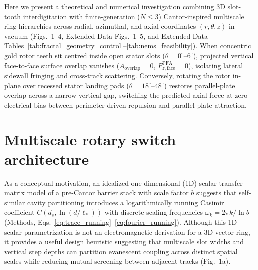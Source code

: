 \documentclass[11pt, a4paper]{article}
\begin{document}
Here we present a theoretical and numerical investigation combining 3D slot-tooth interdigitation with finite-generation ($N \le 3$) Cantor-inspired multiscale ring hierarchies across radial, azimuthal, and axial coordinates $(r, \theta, z)$ in vacuum (Figs.~1--4, Extended Data Figs.~1--5, and Extended Data Tables~\ref{tab:fractal_geometry_control}--\ref{tab:nems_feasibility}). When concentric gold rotor teeth sit centred inside open stator slots ($\theta = 0^\circ\text{--}6^\circ$), projected vertical face-to-face surface overlap vanishes ($A_{\mathrm{overlap}} = 0$, $F_{z,\mathrm{face}}^{\mathrm{PFA}} = 0$), isolating lateral sidewall fringing and cross-track scattering. Conversely, rotating the rotor in-plane over recessed stator landing pads ($\theta = 18^\circ\text{--}48^\circ$) restores parallel-plate overlap across a narrow vertical gap, switching the predicted axial force at zero electrical bias between perimeter-driven repulsion and parallel-plate attraction.

\section*{Multiscale rotary switch architecture}

As a conceptual motivation, an idealized one-dimensional (1D) scalar transfer-matrix model of a pre-Cantor barrier stack with scale factor $b$ suggests that self-similar cavity partitioning introduces a logarithmically running Casimir coefficient $C(d_s, \ln(d/\ell_*))$ with discrete scaling frequencies $\omega_k = 2\pi k / \ln b$ (Methods, Eqs.~\ref{eq:trace_running}--\ref{eq:fourier_running})\cite{gordon2026prd}. Although this 1D scalar parametrization is not an electromagnetic derivation for a 3D vector ring, it provides a useful design heuristic suggesting that multiscale slot widths and vertical step depths can partition evanescent coupling across distinct spatial scales while reducing mutual screening between adjacent tracks (Fig.~1a).
\end{document}
